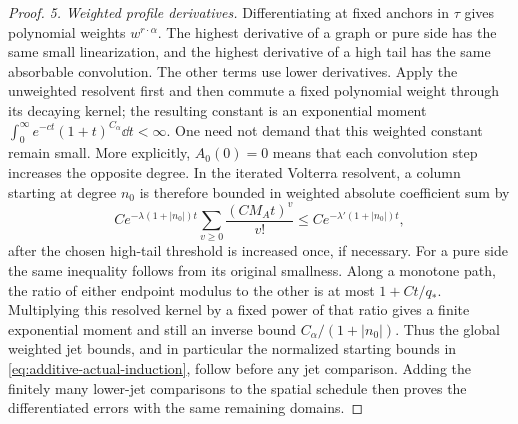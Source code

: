 \begin{proof}
\emph{5. Weighted profile derivatives.}
Differentiating at fixed anchors in $\tau$ gives polynomial weights
$w^{r\cdot\alpha}$.  The highest derivative of a graph or pure side
has the same small linearization, and the highest derivative of a high
tail has the same absorbable convolution.  The other terms use lower
derivatives.  Apply the unweighted resolvent first and then commute a
fixed polynomial weight through its decaying kernel; the resulting
constant is an exponential moment
$\int_0^\infty e^{-ct}(1+t)^{C_\alpha}\dd t<\infty$.
One need not demand that this weighted constant remain small.  More
explicitly, $A_0(0)=0$ means that each convolution step increases the
opposite degree.  In the iterated Volterra resolvent, a column starting
at degree $n_0$ is therefore bounded in weighted absolute coefficient
sum by
\[
 C e^{-\lambda(1+|n_0|)t}
       \sum_{v\ge0}\frac{(CM_A t)^v}{v!}
 \le C e^{-\lambda'(1+|n_0|)t},
\]
after the chosen high-tail threshold is increased once, if necessary.
For a pure side the same inequality follows from its original
smallness.  Along a monotone path, the ratio of either endpoint modulus
to the other is at most $1+Ct/q_*$.  Multiplying this resolved kernel
by a fixed power of that ratio gives a finite exponential moment and
still an inverse bound $C_\alpha/(1+|n_0|)$.  Thus the global weighted
jet bounds, and in particular the normalized starting bounds in
\eqref{eq:additive-actual-induction}, follow before any jet comparison.
Adding the finitely many lower-jet comparisons to the spatial schedule
then proves the differentiated errors with the same remaining domains.


\end{proof}
